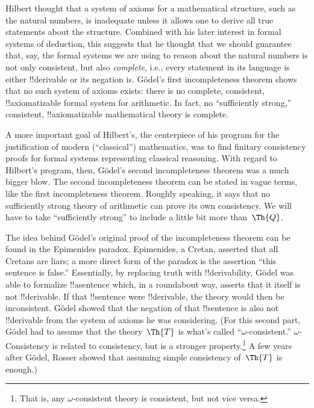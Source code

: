 \documentclass[../../../include/open-logic-section]{subfiles}
\begin{document}


Hilbert thought that a system of axioms for a mathematical structure,
such as the natural numbers, is inadequate unless it allows one to
derive all true statements about the structure. Combined with his
later interest in formal systems of deduction, this suggests that he
thought that we should guarantee that, say, the formal systems we are
using to reason about the natural numbers is not only consistent, but
also \emph{complete}, i.e., every statement in its language is either
!!{derivable} or its negation is. G\"odel's first incompleteness theorem
shows that no such system of axioms exists: there is no complete,
consistent, !!{axiomatizable} formal system for arithmetic.  In fact,
no ``sufficiently strong,'' consistent, !!{axiomatizable} mathematical
theory is complete.

A more important goal of Hilbert's, the centerpiece of his program for
the justification of modern (``classical'') mathematics, was to find
finitary consistency proofs for formal systems representing classical
reasoning.  With regard to Hilbert's program, then, G\"odel's second
incompleteness theorem was a much bigger blow. The second
incompleteness theorem can be stated in vague terms, like the first
incompleteness theorem. Roughly speaking, it says that no sufficiently
strong theory of arithmetic can prove its own consistency. We will
have to take ``sufficiently strong'' to include a little bit more
than~$\Th{Q}$.

The idea behind G\"odel's original proof of the incompleteness theorem
can be found in the Epimenides paradox. Epimenides, a Cretan, asserted
that all Cretans are liars; a more direct form of the paradox is the
assertion ``this sentence is false.'' Essentially, by replacing truth
with !!{derivability}, G\"odel was able to formalize !!a{sentence}
which, in a roundabout way, asserts that it itself is not
!!{derivable}.  If that !!{sentence} were !!{derivable}, the theory
would then be inconsistent.  G\"odel showed that the negation of that
!!{sentence} is also not !!{derivable} from the system of axioms he was
considering. (For this second part, G\"odel had to assume that the
theory~$\Th{T}$ is what's called ``$\omega$-consistent.''
$\omega$-Consistency is related to consistency, but is a stronger
property.\footnote{That is, any $\omega$-consistent theory is
consistent, but not vice versa.} A few years after G\"odel, Rosser
showed that assuming simple consistency of~$\Th{T}$ is enough.)
\end{document}
